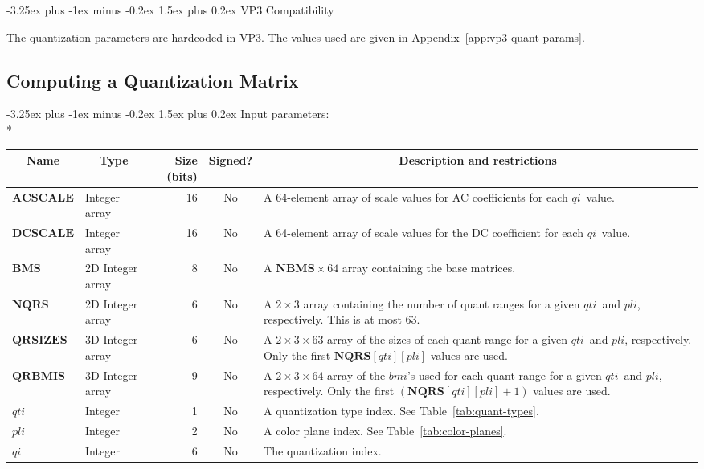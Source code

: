 \documentclass[9pt,letterpaper]{book}
\makeatletter
\newcommand{\idx}[1]{{\ensuremath{\mathit{#1}}}}
\newcommand{\qti}{\idx{qti}}
\newcommand{\pli}{\idx{pli}}
\newcommand{\qi}{\idx{qi}}
\newcommand{\bmi}{\idx{bmi}}
\newcommand{\bitvar}[1]{\ensuremath{\mathbf{\bm{#1}}}}
\numberwithin{equation}{chapter}
\numberwithin{figure}{chapter}
\numberwithin{table}{chapter}
\renewcommand{\paragraph}{\@startsection{paragraph}{4}{0ex}%
 {-3.25ex plus -1ex minus -0.2ex}%
 {1.5ex plus 0.2ex}%
 {\normalfont\normalsize\bfseries}}
\makeatother
\begin{document}
\paragraph{VP3 Compatibility}

The quantization parameters are hardcoded in VP3.
The values used are given in Appendix~\ref{app:vp3-quant-params}.

\subsection{Computing a Quantization Matrix}
\label{sub:quant-mat}

\paragraph{Input parameters:}\hfill\\*
\begin{tabularx}{\textwidth}{@{}llrcX@{}}\toprule
\multicolumn{1}{c}{Name} &
\multicolumn{1}{c}{Type} &
\multicolumn{1}{p{30pt}}{\centering Size (bits)} &
\multicolumn{1}{c}{Signed?} &
\multicolumn{1}{c}{Description and restrictions} \\\midrule\endhead
\bitvar{ACSCALE} & \multicolumn{1}{p{40pt}}{Integer array} &
                             16 & No & A 64-element array of scale values for
 AC coefficients for each \qi\ value. \\
\bitvar{DCSCALE} & \multicolumn{1}{p{40pt}}{Integer array} &
                             16 & No & A 64-element array of scale values for
 the DC coefficient for each \qi\ value. \\
\bitvar{BMS}     & \multicolumn{1}{p{50pt}}{2D Integer array} &
                              8 & No & A $\bitvar{NBMS}\times 64$ array
 containing the base matrices. \\
\bitvar{NQRS}    & \multicolumn{1}{p{50pt}}{2D Integer array} &
                              6 & No & A $2\times 3$ array containing the
 number of quant ranges for a given \qti\ and \pli, respectively.
This is at most $63$. \\
\bitvar{QRSIZES} & \multicolumn{1}{p{50pt}}{3D Integer array} &
                              6 & No & A $2\times 3\times 63$ array of the
 sizes of each quant range for a given \qti\ and \pli, respectively.
Only the first $\bitvar{NQRS}[\qti][\pli]$ values are used. \\
\bitvar{QRBMIS}  & \multicolumn{1}{p{50pt}}{3D Integer array} &
                              9 & No & A $2\times 3\times 64$ array of the
 \bmi's used for each quant range for a given \qti\ and \pli, respectively.
Only the first $(\bitvar{NQRS}[\qti][\pli]+1)$ values are used. \\
\bitvar{\qti}    & Integer &  1 & No & A quantization type index.
See Table~\ref{tab:quant-types}.\\
\bitvar{\pli}    & Integer &  2 & No & A color plane index.
See Table~\ref{tab:color-planes}.\\
\bitvar{\qi}     & Integer &  6 & No & The quantization index. \\
\bottomrule\end{tabularx}
\end{document}
